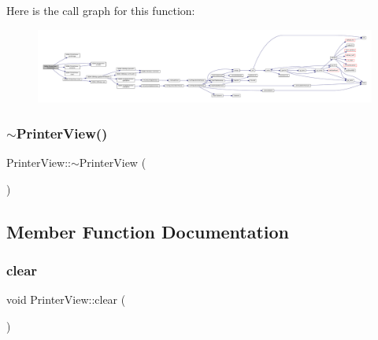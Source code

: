 Here is the call graph for this function\+:
\nopagebreak
\begin{figure}[H]
\begin{center}
\leavevmode
\includegraphics[width=350pt]{class_q_g_b_a_1_1_printer_view_a7145e3fa1fbb7d0d112aad28ee172131_cgraph}
\end{center}
\end{figure}
\mbox{\label{class_q_g_b_a_1_1_printer_view_aa7d2a46ee714b3cedff0fd1c0df194c5}} 
\subsubsection{\texorpdfstring{$\sim$\+Printer\+View()}{~PrinterView()}}
{\footnotesize\ttfamily Printer\+View\+::$\sim$\+Printer\+View (\begin{DoxyParamCaption}{ }\end{DoxyParamCaption})}



\subsection{Member Function Documentation}
\mbox{\label{class_q_g_b_a_1_1_printer_view_a92761518133141eb63987760778ec741}} 
\subsubsection{\texorpdfstring{clear}{clear}}
{\footnotesize\ttfamily void Printer\+View\+::clear (\begin{DoxyParamCaption}{ }\end{DoxyParamCaption})\hspace{0.3cm}{\ttfamily [slot]}}

